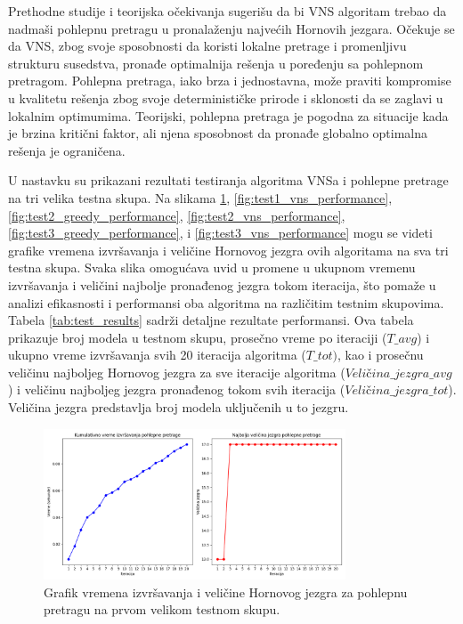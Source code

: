 \documentclass[12pt,oneside]{memoir}
\begin{document}
Prethodne studije i teorijska očekivanja sugerišu da bi VNS algoritam trebao da nadmaši pohlepnu pretragu u pronalaženju najvećih Hornovih jezgara. Očekuje se da VNS, zbog svoje sposobnosti da koristi lokalne pretrage i promenljivu strukturu susedstva, pronađe optimalnija rešenja u poređenju sa pohlepnom pretragom. Pohlepna pretraga, iako brza i jednostavna, može praviti kompromise u kvalitetu rešenja zbog svoje determinističke prirode i sklonosti da se zaglavi u lokalnim optimumima. Teorijski, pohlepna pretraga je pogodna za situacije kada je brzina kritični faktor, ali njena sposobnost da pronađe globalno optimalna rešenja je ograničena.

U nastavku su prikazani rezultati testiranja algoritma VNSa i pohlepne pretrage na tri velika testna skupa. Na slikama \ref{fig:test1_greedy_performance}, \ref{fig:test1_vns_performance}, \ref{fig:test2_greedy_performance}, \ref{fig:test2_vns_performance}, \ref{fig:test3_greedy_performance}, i \ref{fig:test3_vns_performance} mogu se videti grafike vremena izvršavanja i veličine Hornovog jezgra ovih algoritama na sva tri testna skupa. Svaka slika omogućava uvid u promene u ukupnom vremenu izvršavanja i veličini najbolje pronađenog jezgra tokom iteracija, što pomaže u analizi efikasnosti i performansi oba algoritma na različitim testnim skupovima. Tabela \ref{tab:test_results} sadrži detaljne rezultate performansi. Ova tabela prikazuje broj modela u testnom skupu, prosečno vreme po iteraciji ($T\_avg$) i ukupno vreme izvršavanja svih 20 iteracija algoritma ($T\_tot)$, kao i prosečnu veličinu najboljeg Hornovog jezgra za sve iteracije algoritma ($Veličina\_jezgra\_avg$) i veličinu najboljeg jezgra pronađenog tokom svih iteracija ($Veličina\_jezgra\_tot$). Veličina jezgra predstavlja broj modela uključenih u to jezgru.


\begin{figure}[H]
    \centering
    \includegraphics[width=0.8\textwidth]{test1_greedy_performance.png}
    \caption{Grafik vremena izvršavanja i veličine Hornovog jezgra za pohlepnu pretragu na prvom velikom testnom skupu.}
    \label{fig:test1_greedy_performance}
\end{figure}
\end{document}
